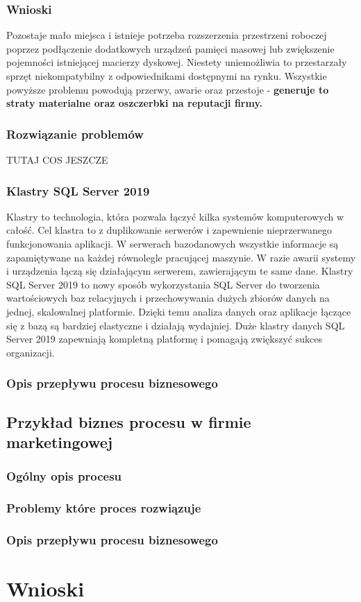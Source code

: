 \documentclass[a4paper, 12pt]{article}
\begin{document}
	  \subsubsection{Wnioski} 
	
			 	\hspace*{1cm} Pozostaje mało miejsca i istnieje potrzeba rozszerzenia przestrzeni roboczej poprzez podłączenie dodatkowych urządzeń pamięci masowej lub zwiększenie pojemności istniejącej macierzy dyskowej. Niestety uniemożliwia to przestarzały sprzęt niekompatybilny z odpowiednikami dostępnymi na rynku.\newline
			\hspace*{1cm}  Wszystkie powyższe problemu powodują przerwy, awarie oraz  przestoje - \textbf{generuje to straty materialne oraz oszczerbki na reputacji firmy.}
			
			\newpage
			\subsubsection{Rozwiązanie problemów}
				TUTAJ COS JESZCZE
				\subsubsection{Klastry SQL Server 2019} 	
	\hspace*{1cm} Klastry to technologia, która pozwala łączyć kilka systemów komputerowych w całość. 
Cel klastra to z duplikowanie  serwerów i zapewnienie nieprzerwanego funkcjonowania aplikacji. W serwerach bazodanowych wszystkie informacje są zapamiętywane na każdej równolegle pracującej maszynie. W razie awarii systemy i urządzenia łączą się działającym serwerem, zawierającym te same dane.
\newline
	\hspace*{1cm}Klastry SQL Server 2019 to nowy sposób wykorzystania SQL Server do tworzenia wartościowych baz relacyjnych i przechowywania dużych zbiorów danych na jednej, skalowalnej platformie. Dzięki temu analiza danych oraz aplikacje łączące się z bazą są bardziej elastyczne i działają wydajniej. Duże klastry danych SQL Server 2019 zapewniają kompletną platformę i pomagają zwiększyć sukces  organizacji.
\subsubsection{Opis przepływu procesu biznesowego}

\subsection{Przykład biznes procesu w firmie marketingowej}
\subsubsection{Ogólny opis procesu}
\subsubsection{Problemy które proces rozwiązuje}
\subsubsection{Opis przepływu procesu biznesowego}

\section{Wnioski} 


\label{LastPage}~
\label{LastPageOfBackMatter}~		
\end{document}
